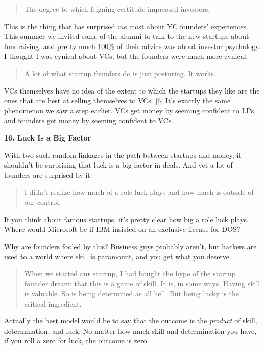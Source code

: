 \begin{quote}
The degree to which feigning certitude impressed investors.
\end{quote}

This is the thing that has surprised \emph{me} most about YC founders'
experiences. This summer we invited some of the alumni to talk to the
new startups about fundraising, and pretty much 100\% of their advice
was about investor psychology. I thought I was cynical about VCs, but
the founders were much more cynical.

\begin{quote}
A lot of what startup founders do is just posturing. It works.
\end{quote}

VCs themselves have no idea of the extent to which the startups they
like are the ones that are best at selling themselves to VCs.
{[}\hyperref[f6n]{6}{]} It's exactly the same phenomenon we saw a step
earlier. VCs get money by seeming confident to LPs, and founders get
money by seeming confident to VCs.

\textbf{16. Luck Is a Big Factor}

With two such random linkages in the path between startups and money, it
shouldn't be surprising that luck is a big factor in deals. And yet a
lot of founders are surprised by it.

\begin{quote}
I didn't realize how much of a role luck plays and how much is outside
of our control.
\end{quote}

If you think about famous startups, it's pretty clear how big a role
luck plays. Where would Microsoft be if IBM insisted on an exclusive
license for DOS?

Why are founders fooled by this? Business guys probably aren't, but
hackers are used to a world where skill is paramount, and you get what
you deserve.

\begin{quote}
When we started our startup, I had bought the hype of the startup
founder dream: that this is a game of skill. It is, in some ways. Having
skill is valuable. So is being determined as all hell. But being lucky
is the critical ingredient.
\end{quote}

Actually the best model would be to say that the outcome is the
\emph{product} of skill, determination, and luck. No matter how much
skill and determination you have, if you roll a zero for luck, the
outcome is zero.

